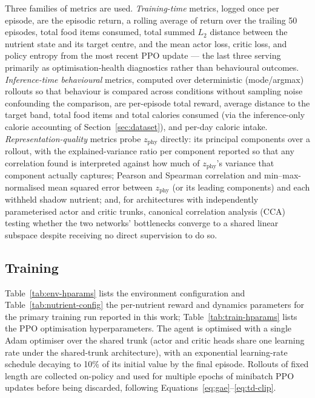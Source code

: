 \documentclass[10pt,twocolumn]{article}
\begin{document}
Three families of metrics are used. \emph{Training-time} metrics, logged once per episode, are the episodic return, a rolling average of return over the trailing 50 episodes, total food items consumed, total summed $L_2$ distance between the nutrient state and its target centre, and the mean actor loss, critic loss, and policy entropy from the most recent PPO update — the last three serving primarily as optimisation-health diagnostics rather than behavioural outcomes. \emph{Inference-time behavioural} metrics, computed over deterministic (mode/argmax) rollouts so that behaviour is compared across conditions without sampling noise confounding the comparison, are per-episode total reward, average distance to the target band, total food items and total calories consumed (via the inference-only calorie accounting of Section~\ref{sec:dataset}), and per-day caloric intake. \emph{Representation-quality} metrics probe $z_\text{phy}$ directly: its principal components over a rollout, with the explained-variance ratio per component reported so that any correlation found is interpreted against how much of $z_\text{phy}$'s variance that component actually captures; Pearson and Spearman correlation and min–max-normalised mean squared error between $z_\text{phy}$ (or its leading components) and each withheld shadow nutrient; and, for architectures with independently parameterised actor and critic trunks, canonical correlation analysis (CCA) testing whether the two networks' bottlenecks converge to a shared linear subspace despite receiving no direct supervision to do so.

\subsection{Training}
\label{sec:training}

Table~\ref{tab:env-hparams} lists the environment configuration and Table~\ref{tab:nutrient-config} the per-nutrient reward and dynamics parameters for the primary training run reported in this work; Table~\ref{tab:train-hparams} lists the PPO optimisation hyperparameters. The agent is optimised with a single Adam optimiser over the shared trunk (actor and critic heads share one learning rate under the shared-trunk architecture), with an exponential learning-rate schedule decaying to 10\% of its initial value by the final episode. Rollouts of fixed length are collected on-policy and used for multiple epochs of minibatch PPO updates before being discarded, following Equations~\eqref{eq:gae}--\eqref{eq:td-clip}.
\end{document}
